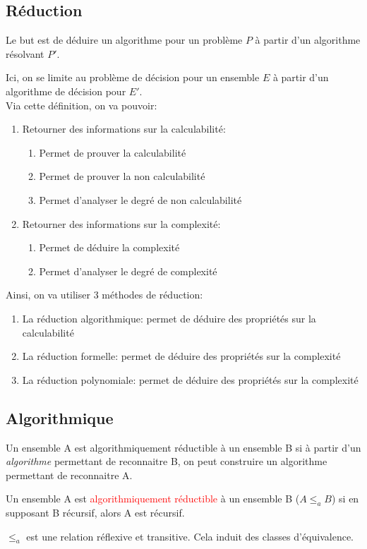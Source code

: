 \documentclass{report}
\begin{document}
\subsection{Réduction}
Le but est de déduire un algorithme pour un problème $P$ à partir d'un algorithme résolvant $P'$.\par
Ici, on se limite au problème de décision pour un ensemble $E$ à partir d'un algorithme de décision pour $E'$.\\
Via cette définition, on va pouvoir:
\begin{enumerate}
\item Retourner des informations sur la calculabilité:
	\begin{enumerate}
	\item Permet de prouver la calculabilité
	\item Permet de prouver la non calculabilité
	\item Permet d'analyser le degré de non calculabilité
	\end{enumerate}
\item Retourner des informations sur la complexité:
	\begin{enumerate}
	\item Permet de déduire la complexité
	\item Permet d'analyser le degré de complexité
	\end{enumerate}
\end{enumerate}
Ainsi, on va utiliser 3 méthodes de réduction:
\begin{enumerate}
\item La réduction algorithmique: permet de déduire des propriétés sur la calculabilité
\item La réduction formelle:  permet de déduire des propriétés sur la complexité
\item La réduction polynomiale:  permet de déduire des propriétés sur la complexité
\end{enumerate}

\subsection{Algorithmique}
Un ensemble A est algorithmiquement réductible à un ensemble B si à partir d'un \textit{algorithme} permettant de reconnaitre B, on peut construire un algorithme permettant de reconnaitre A.\par
Un ensemble A est \textcolor{red}{algorithmiquement réductible} à un ensemble B ($A \leqslant_a B$) si en supposant B récursif, alors A est récursif.\par
$\leqslant_a$ est une relation réflexive et transitive. Cela induit des classes d'équivalence.
\end{document}
